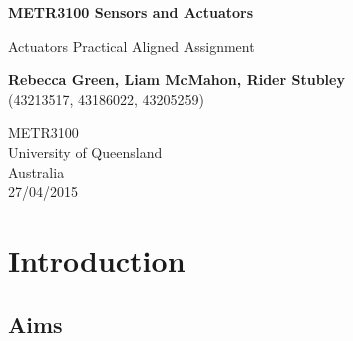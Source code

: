 \documentclass[12pt]{report}
\title{}
\author{Rebecca Green, Liam McMahon, Rider Stubley}
\begin{document}
	
	\begin{titlepage}
		\begin{center}
			\vspace*{1cm}
			
			\textbf{METR3100 Sensors and Actuators}
			
			\vspace{0.5cm}
			Actuators Practical Aligned Assignment
			
			\vspace{1.5cm}
			\textbf{Rebecca Green, Liam McMahon, Rider Stubley} \\
			\vspace{0.5cm}
			(43213517, 43186022, 43205259)
			
			\vfill
			
			METR3100 \\
			University of Queensland \\
			Australia \\
			27/04/2015 \\
		\end{center}
	\end{titlepage}
	
	\begin{abstract}
		
	\end{abstract}
	
	\tableofcontents
	
	\chapter{Introduction}
	
	\section{Aims}
	
\end{document}
